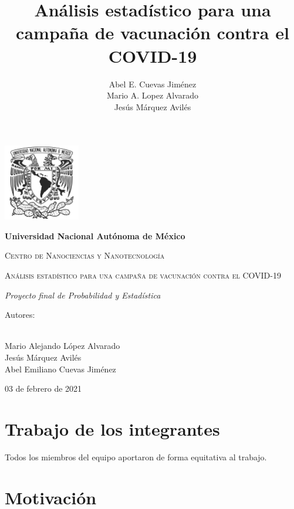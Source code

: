 \documentclass[12pt,a4paper]{article}
\author{Abel E. Cuevas Jiménez \\ Mario A. Lopez Alvarado \\ Jesús Márquez Avilés} %
\title{\bf{Análisis estadístico para una campaña de vacunación contra el COVID-19}}
\begin{document}
\begin{titlepage}
\centering
{\includegraphics[width=0.25\textwidth]{unam.jpg}\par}
\vspace{0.5cm}
{\bfseries\LARGE Universidad Nacional Autónoma de México \par}
\vspace{.5cm}
{\scshape\Large Centro de Nanociencias y Nanotecnología \par}
\vspace{2.5cm}
{\scshape\Huge Análisis estadístico para una campaña de vacunación contra el COVID-19 \par}
\vspace{2.5cm}
{\itshape\Large Proyecto final de Probabilidad y Estadística \par}
\vfill
{\Large Autores: \par}
{\Large \\Mario Alejando López Alvarado\\ Jesús Márquez Avilés\\ Abel Emiliano Cuevas Jiménez\par}
\vfill
{\Large 03 de febrero de 2021 \par}
\end{titlepage}


\newpage
\tableofcontents
\newpage


\section{Trabajo de los integrantes}
\setlength{\parindent}{0cm}
Todos los miembros del equipo aportaron de forma equitativa al trabajo.
\setlength{\parindent}{1cm}


\section{Motivación}
\end{document}
